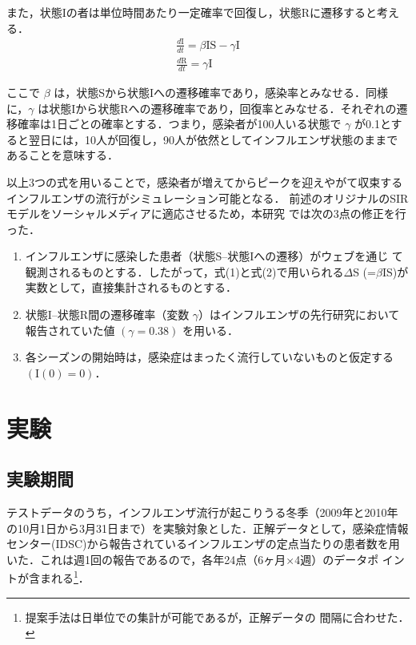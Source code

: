 \documentclass[japanese]{jnlp_1.4}
\begin{document}
また，状態Iの者は単位時間あたり一定確率で回復し，状態Rに遷移すると考え
る．
\begin{gather}
\frac{d\mathrm{I}}{dt}= \beta \mathrm{IS} - \gamma \mathrm{I}\\
\frac{d\mathrm{R}}{dt}= \gamma \mathrm{I}
\end{gather}

ここで $\beta$ は，状態Sから状態Iへの遷移確率であり，感染率とみなせる．同様
に，$\gamma$ は状態Iから状態Rへの遷移確率であり，回復率とみなせる．それぞれの遷
移確率は1日ごとの確率とする．つまり，感染者が100人いる状態で $\gamma$ が0.1とす
ると翌日には，10人が回復し，90人が依然としてインフルエンザ状態のままで
あることを意味する．

以上3つの式を用いることで，感染者が増えてからピークを迎えやがて収束する
インフルエンザの流行がシミュレーション可能となる．
前述のオリジナルのSIRモデルをソーシャルメディアに適応させるため，本研究
では次の3点の修正を行った．

\begin{enumerate}
\item インフルエンザに感染した患者（状態S--状態Iへの遷移）がウェブを通じ
  て観測されるものとする．したがって，式(1)と式(2)で用いられる$\Delta$S (=$\beta$IS)が
  実数として，直接集計されるものとする．
\item 状態I--状態R間の遷移確率（変数 $\gamma$）はインフルエンザの先行研究\cite{Anderson1979}において報告されていた値 $(\gamma=0.38)$ を用いる．
\item 各シーズンの開始時は，感染症はまったく流行していないものと仮定する $(\mathrm{I}(0)=0)$．
\end{enumerate}



\section{実験}

\subsection{実験期間}

テストデータのうち，インフルエンザ流行が起こりうる冬季（2009年と2010年
の10月1日から3月31日まで）を実験対象とした．正解データとして，感染症情報
センター(IDSC)から報告されているインフルエンザの定点当たりの患者数を用
いた．これは週1回の報告であるので，各年24点（6ヶ月×4週）のデータポ
イントが含まれる\footnote{提案手法は日単位での集計が可能であるが，正解データの
間隔に合わせた．}．
\end{document}
